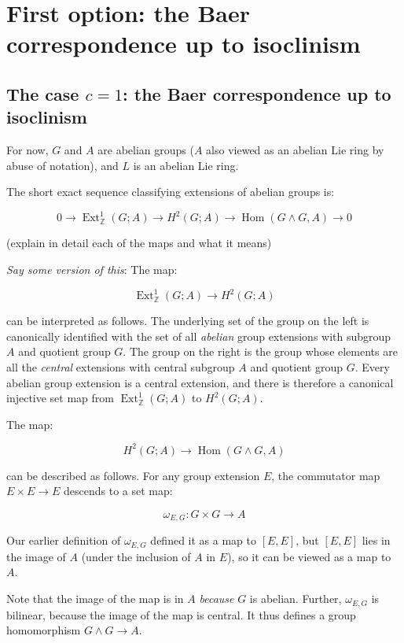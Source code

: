 \documentclass[10pt]{amsart}
\begin{document}
\section{First option: the Baer correspondence up to isoclinism}

\subsection{The case $c = 1$: the Baer correspondence up to isoclinism}

For now, $G$ and $A$ are abelian groups ($A$ also viewed as an abelian
Lie ring by abuse of notation), and $L$ is an abelian Lie ring.

The short exact sequence classifying extensions of abelian groups is:

\begin{equation}\label{eq:ses-uct-abelian}
  0 \to \operatorname{Ext}^1_{\mathbb{Z}}(G;A) \to H^2(G;A) \to \operatorname{Hom}(G \wedge G,A) \to 0
\end{equation}

(explain in detail each of the maps and what it means)

{\em Say some version of this}: The map:

$$\operatorname{Ext}^1_{\mathbb{Z}}(G;A) \to H^2(G;A)$$

can be interpreted as follows. The underlying set of the group on the
left is canonically identified with the set of all {\em abelian} group
extensions with subgroup $A$ and quotient group $G$. The group on the
right is the group whose elements are all the {\em central} extensions
with central subgroup $A$ and quotient group $G$. Every abelian group
extension is a central extension, and there is therefore a canonical
injective set map from $\operatorname{Ext}^1_{\mathbb{Z}}(G;A)$ to
$H^2(G;A)$.

The map:

$$H^2(G;A) \to \operatorname{Hom}(G \wedge G,A)$$

can be described as follows. For any group extension $E$, the
commutator map $E \times E \to E$ descends to a set map:

$$\omega_{E,G}: G \times G \to A$$

Our earlier definition of $\omega_{E,G}$ defined it as a map to
$[E,E]$, but $[E,E]$ lies in the image of $A$ (under the inclusion of
$A$ in $E$), so it can be viewed as a map to $A$.

Note that the image of the map is in $A$ {\em because} $G$ is
abelian. Further, $\omega_{E,G}$ is bilinear, because the image of the map
is central. It thus defines a group homomorphism $G \wedge G \to A$.
\end{document}
